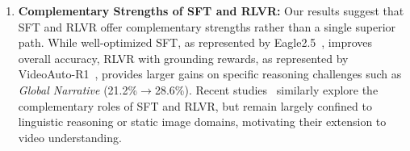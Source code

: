\documentclass[runningheads]{llncs}
\begin{document}
{\begin{enumerate}
            Despite its importance, the systematic investigation of reward structures for video reasoning remains largely underexplored, representing a potential area for future research.
            \item \textbf{Complementary Strengths of SFT and RLVR:} Our results suggest that SFT and RLVR offer complementary strengths rather than a single superior path. 
            While well-optimized SFT, as represented by Eagle2.5~\cite{eagle25}, improves overall accuracy, RLVR with grounding rewards, as represented by VideoAuto-R1~\cite{videoautor1}, provides larger gains on specific reasoning challenges such as \textit{Global Narrative} (21.2\%$\rightarrow$28.6\%).
            Recent studies~\cite{limitofrlvr, chu2025sft} similarly explore the complementary roles of SFT and RLVR, but remain largely confined to linguistic reasoning or static image domains, motivating their extension to video understanding.
        \end{enumerate}
        
}
\end{document}
